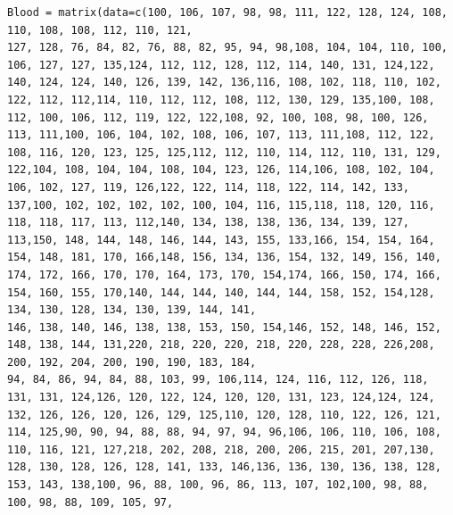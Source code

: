 \documentclass[12pt, a4paper]{report}
\theoremstyle{plain}
\theoremstyle{definition}
\theoremstyle{remark}
\begin{document}
\begin{framed}
\begin{verbatim}
Blood = matrix(data=c(100, 106, 107, 98, 98, 111, 122, 128, 124, 108, 110, 108, 108, 112, 110, 121, 
127, 128, 76, 84, 82, 76, 88, 82, 95, 94, 98,108, 104, 104, 110, 100, 106, 127, 127, 135,124, 112, 112, 128, 112, 114, 140, 131, 124,122, 140, 124, 124, 140, 126, 139, 142, 136,116, 108, 102, 118, 110, 102, 122, 112, 112,114, 110, 112, 112, 108, 112, 130, 129, 135,100, 108, 112, 100, 106, 112, 119, 122, 122,108, 92, 100, 108, 98, 100, 126, 113, 111,100, 106, 104, 102, 108, 106, 107, 113, 111,108, 112, 122, 108, 116, 120, 123, 125, 125,112, 112, 110, 114, 112, 110, 131, 129, 122,104, 108, 104, 104, 108, 104, 123, 126, 114,106, 108, 102, 104, 106, 102, 127, 119, 126,122, 122, 114, 118, 122, 114, 142, 133, 137,100, 102, 102, 102, 102, 100, 104, 116, 115,118, 118, 120, 116, 118, 118, 117, 113, 112,140, 134, 138, 138, 136, 134, 139, 127, 113,150, 148, 144, 148, 146, 144, 143, 155, 133,166, 154, 154, 164, 154, 148, 181, 170, 166,148, 156, 134, 136, 154, 132, 149, 156, 140,
174, 172, 166, 170, 170, 164, 173, 170, 154,174, 166, 150, 174, 166, 154, 160, 155, 170,140, 144, 144, 140, 144, 144, 158, 152, 154,128, 134, 130, 128, 134, 130, 139, 144, 141,
146, 138, 140, 146, 138, 138, 153, 150, 154,146, 152, 148, 146, 152, 148, 138, 144, 131,220, 218, 220, 220, 218, 220, 228, 228, 226,208, 200, 192, 204, 200, 190, 190, 183, 184,
94, 84, 86, 94, 84, 88, 103, 99, 106,114, 124, 116, 112, 126, 118, 131, 131, 124,126, 120, 122, 124, 120, 120, 131, 123, 124,124, 124, 132, 126, 126, 120, 126, 129, 125,110, 120, 128, 110, 122, 126, 121, 114, 125,90, 90, 94, 88, 88, 94, 97, 94, 96,106, 106, 110, 106, 108, 110, 116, 121, 127,218, 202, 208, 218, 200, 206, 215, 201, 207,130, 128, 130, 128, 126, 128, 141, 133, 146,136, 136, 130, 136, 138, 128, 153, 143, 138,100, 96, 88, 100, 96, 86, 113, 107, 102,100, 98, 88, 100, 98, 88, 109, 105, 97,

\end{verbatim}
\end{framed}
\end{document}
